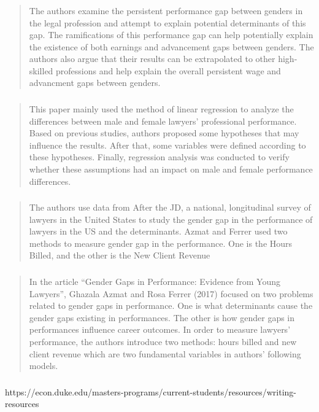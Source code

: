 \documentclass[notes=show,beamer,compress]{beamer}
\begin{document}
\begin{frame}\frametitle{}
\begin{quote}
 The authors examine the persistent performance gap between genders in
the legal profession and attempt to explain potential determinants of this gap. The ramifications of this performance gap can help potentially
explain the existence of both earnings and advancement gaps between genders. The authors also argue that their results can be extrapolated to
other high-skilled professions and help explain the overall persistent wage and advancment gaps between genders. 
\end{quote}
\end{frame}

\begin{frame}\frametitle{}
\begin{quote}
 This paper mainly used the method of linear regression to analyze the differences between male
and female lawyers' professional performance. Based on previous studies, authors proposed some
hypotheses that may influence the results. After that, some variables were defined according to
these hypotheses. Finally, regression analysis was conducted to verify whether these assumptions
had an impact on male and female performance differences.
\end{quote}
\end{frame}

\begin{frame}\frametitle{}
\begin{quote}
 The authors use data from After the JD, a national, longitudinal survey of lawyers
in the United States to study the gender gap in the performance of lawyers in the US
and the determinants. Azmat and Ferrer used two methods to measure gender gap in
the performance. One is the Hours Billed, and the other is the New Client Revenue
\end{quote}
\end{frame}

\begin{frame}\frametitle{}
\begin{quote}
In the article “Gender Gaps in Performance: Evidence from Young Lawyers”, Ghazala Azmat and
Rosa Ferrer (2017) focused on two problems related to gender gaps in performance. One is
what determinants cause the gender gaps existing in performances. The other is how gender
gaps in performances influence career outcomes. In order to measure lawyers’ performance,
the authors introduce two methods: hours billed and new client revenue which are two
fundamental variables in authors’ following models.
\end{quote}
\end{frame}

\begin{frame}\frametitle{}
https://econ.duke.edu/masters-programs/current-students/resources/writing-resources
\end{frame}
\end{document}
